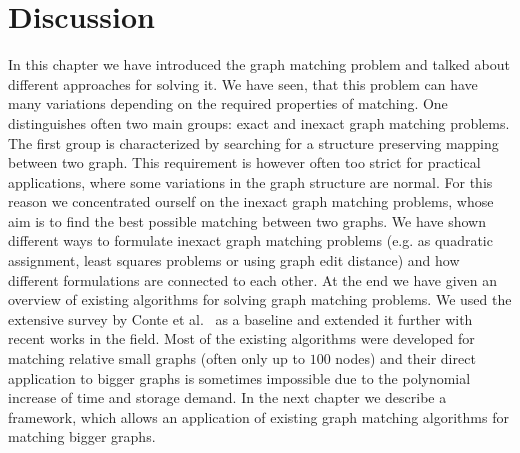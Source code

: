 
\section{Discussion}
In this chapter we have introduced the graph matching problem and talked about different approaches for solving it. We have seen, that this problem can have many variations depending on the required properties of matching. One distinguishes often two main groups: exact and inexact graph matching problems. The first group is characterized by searching for a structure preserving mapping between two graph. This requirement is however often too strict for practical applications, where some variations in the graph structure are normal. For this reason we concentrated ourself on the inexact graph matching problems, whose aim is to find the best possible matching between two graphs. We have shown different ways to formulate inexact graph matching problems (e.g. as quadratic assignment, least squares problems or using graph edit distance) and how different formulations are connected to each other. At the end we have given an overview of existing algorithms for solving graph matching problems. We used the extensive survey by Conte et al.~\cite{Conte2004} as a baseline and extended it further with recent works in the field. Most of the existing algorithms were developed for matching relative small graphs (often only up to $100$ nodes) and their direct application to bigger graphs is sometimes impossible due to the polynomial increase of time and storage demand. 
In the next chapter we describe a framework, which allows an application of existing graph matching algorithms for matching bigger graphs.
